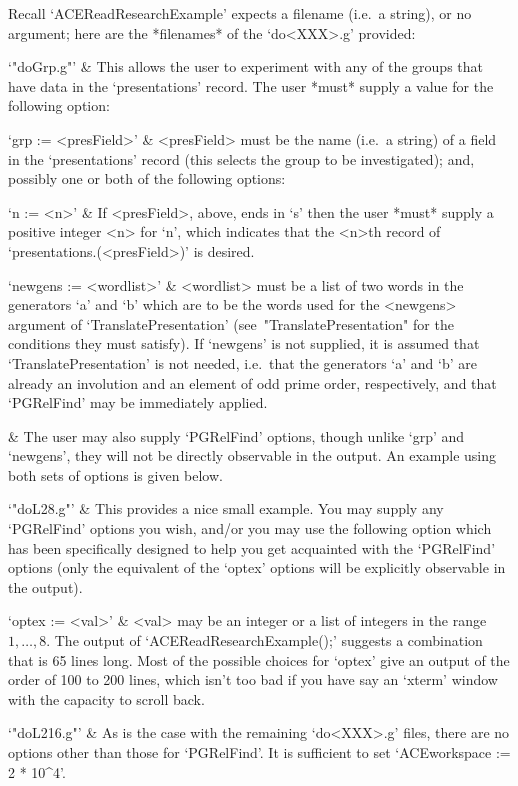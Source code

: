 Recall `ACEReadResearchExample' expects a filename (i.e.~a string), or
no argument; here are the *filenames* of the `do<XXX>.g' provided:

\beginitems

\quad`"doGrp.g"' &
This allows the user to experiment with any of the  groups  that  have
data in the `presentations' record. The user *must* supply a value for
the following option:

\qquad`grp := <presField>' &
<presField> must be the  name  (i.e.~a  string)  of  a  field  in  the
`presentations' record (this selects the group  to  be  investigated);
and, possibly one or both of the following options:

\qquad`n := <n>' &
If <presField>, above, ends in `s'  then  the  user  *must*  supply  a
positive integer <n> for `n', which indicates that the <n>th record of
`presentations.(<presField>)' is desired.

\qquad`newgens := <wordlist>' &
<wordlist> must be a list of two words in the generators `a'  and  `b'
which are  to  be  the  words  used  for  the  <newgens>  argument  of
`TranslatePresentation'    (see~"TranslatePresentation"    for     the
conditions they must satisfy). If `newgens' is  not  supplied,  it  is
assumed that `TranslatePresentation'  is  not  needed,  i.e.~that  the
generators `a' and `b' are already an involution and an element of odd
prime order, respectively, and that  `PGRelFind'  may  be  immediately
applied.

&
The user may also supply `PGRelFind' options, though unlike `grp'  and
`newgens', they will not be directly observable in the output. 
An example using both sets of options is given below.

\quad`"doL28.g"' &
This provides a nice small example. You  may  supply  any  `PGRelFind'
options you wish, and/or you may use the following  option  which  has
been specifically  designed  to  help  you  get  acquainted  with  the
`PGRelFind' options (only the equivalent of the `optex'  options  will
be explicitly observable in the output).

\qquad`optex := <val>' &
<val>  may  be  an  integer  or  a  list  of  integers  in  the  range
$1,\ldots,8$. The output  of  `ACEReadResearchExample();'  suggests  a
combination that is 65 lines long. Most of the  possible  choices  for
`optex' give an output of the order of 100 to 200 lines,  which  isn't
too bad if you have say an `xterm' window with the capacity to  scroll
back.

\quad`"doL216.g"' &
As is the case with the remaining  `do<XXX>.g'  files,  there  are  no
options other than those for `PGRelFind'.  It  is  sufficient  to  set
`ACEworkspace := 2 * 10^4'.

